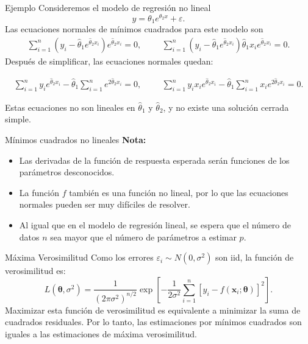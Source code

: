 \documentclass[aspectratio = 169, spanish]{beamer}
\begin{document}
\begin{frame}{Ejemplo}
    Consideremos el modelo de regresión no lineal
\[
y = \theta_1 e^{\theta_2 x} + \varepsilon.
\]
Las ecuaciones normales de mínimos cuadrados para este modelo son
\begin{align*}
    \sum_{i=1}^{n} \left( y_i - \hat{\theta}_1 e^{\hat{\theta}_2 x_i} \right) e^{\hat{\theta}_2 x_i} = 0,\hspace{1cm}
\sum_{i=1}^{n} \left( y_i - \hat{\theta}_1 e^{\hat{\theta}_2 x_i} \right) \hat{\theta}_1 x_i e^{\hat{\theta}_2 x_i} = 0.
\end{align*}
Después de simplificar, las ecuaciones normales quedan:

\begin{align*}
     \sum_{i=1}^{n} y_i e^{\hat{\theta}_2 x_i} - \hat{\theta}_1 \sum_{i=1}^{n} e^{2\hat{\theta}_2 x_i} = 0,\hspace{1cm}\sum_{i=1}^{n} y_i x_i e^{\hat{\theta}_2 x_i} - \hat{\theta}_1 \sum_{i=1}^{n} x_i e^{2\hat{\theta}_2 x_i} = 0.
\end{align*}
   
Estas ecuaciones no son lineales en $\hat{\theta}_1$ y $\hat{\theta}_2$, y no existe una solución cerrada simple.

\end{frame}

\begin{frame}{Mínimos cuadrados no lineales}
    \textbf{Nota: }
\begin{itemize}
    \item Las derivadas de la función de respuesta esperada serán funciones de los parámetros desconocidos.
    \item La función $f$ también es una función no lineal, por lo que las ecuaciones normales pueden ser muy difíciles de resolver.
    \item Al igual que en el modelo de regresión lineal, se espera que el número de datos $n$ sea mayor que el número de parámetros a estimar $p$.
\end{itemize}
\end{frame}
\begin{frame}{Máxima Verosimilitud}
Como los errores $\varepsilon_i \sim N(0, \sigma^2)$ son iid, la función de verosimilitud es:
\[
L(\bm\theta, \sigma^2) = \frac{1}{(2\pi\sigma^2)^{n/2}} \exp\left[ -\frac{1}{2\sigma^2} \sum_{i=1}^n \left[y_i - f(\bm{x}_i; \bm{\theta})\right]^2 \right].
\]
Maximizar esta función de verosimilitud es equivalente a minimizar la suma de cuadrados residuales. Por lo tanto, las estimaciones por mínimos cuadrados son iguales a las estimaciones de máxima verosimilitud.
\end{frame}
\end{document}
